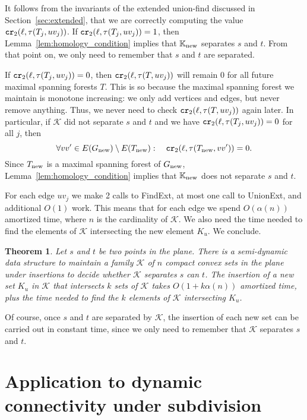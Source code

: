 \documentclass[a4paper,11pt]{article}
\newcommand{\KKnew}{\mathbb{K}_{\rm new}}
\newcommand{\Gnew}{G_{\rm new}}
\newcommand{\Tnew}{T_{\rm new}}
\newcommand{\calK}{\mathcal{K}}
\def\findext{\mbox{\sc FindExt}}
\def\unionext{\mbox{\sc UnionExt}}
\newcommand\CR{\mbox{\tt cr}_2}
\newtheorem{theorem}{Theorem}
\begin{document}
It follows from the invariants of the extended union-find discussed in
Section~\ref{sec:extended}, that we are correctly computing the value
$\CR(\ell,\tau(T_j,uv_j))$. 
If $\CR(\ell,\tau(T_j,uv_j))=1$, then Lemma~\ref{lem:homology_condition}
implies that $\KKnew$ separates $s$ and $t$. From that point on,
we only need to remember that $s$ and $t$ are separated.

If $\CR(\ell,\tau(T_j,uv_j))=0$, then $\CR(\ell,\tau(T,uv_j))$ will
remain $0$ for all future maximal spanning forests $T$.
This is so because the maximal spanning forest we maintain is monotone increasing:
we only add vertices and edges, but never remove anything.
Thus, we never need to check $\CR(\ell,\tau(T,uv_j))$ again later.
In particular, if $\calK$ did not separate $s$ and $t$ and 
we have $\CR(\ell,\tau(T_j,uv_j))=0$ for all $j$,
then
\[
	\forall vv'\in E(\Gnew)\setminus E(\Tnew):~~~ \CR(\ell,\tau(\Tnew,vv'))=0.
\]
Since $\Tnew$ is a maximal spanning forest of $\Gnew$,
Lemma~\ref{lem:homology_condition} implies that $\KKnew$ 
does not separate $s$ and $t$. 

For each edge $uv_j$ we make 2 calls to \findext, at most one call to \unionext,
and additional $O(1)$ work. This means that for each edge we spend
$O(\alpha(n))$ amortized time, where $n$ is the cardinality of $\calK$.
We also need the time needed to find the elements of $\calK$ intersecting the new
element $K_u$. We conclude.

\begin{theorem}
\label{thm:main}
	Let $s$ and $t$ be two points in the plane.
	There is a semi-dynamic data structure to maintain a family $\calK$ of $n$ compact convex
	sets in the plane under insertions to decide whether $\calK$ separates $s$ can $t$.
	The insertion of a new set $K_u$ in $\calK$ that intersects $k$ sets of $\calK$ 
	takes $O(1+k \alpha(n))$ amortized time, plus the time needed to find
	the $k$ elements of $\calK$ intersecting $K_u$.
\end{theorem}

Of course, once $s$ and $t$ are separated by $\calK$, the insertion of each new
set can be carried out in constant time, since we only need to remember that
$\calK$ separates $s$ and $t$.


\section{Application to dynamic connectivity under subdivision}
\label{sec:subdivision}
\end{document}
